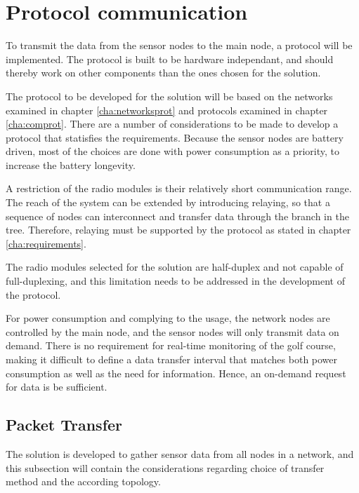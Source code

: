 \section{Protocol communication} \label{cha:protocolDesign}
To transmit the data from the sensor nodes to the main node, a protocol will be implemented. The protocol is built to be hardware independant, and should thereby work on other components than the ones chosen for the solution.

The protocol to be developed for the solution will be based on the networks examined in chapter \ref{cha:networksprot} and protocols examined in chapter \ref{cha:comprot}.
There are a number of considerations to be made to develop a protocol that statisfies the requirements.
Because the sensor nodes are battery driven, most of the choices are done with power consumption as a priority, to increase the battery longevity.

A restriction of the radio modules is their relatively short communication range. The reach of the system can be extended by introducing relaying, so that a sequence of nodes can interconnect and transfer data through the branch in the tree. Therefore, relaying must be supported by the protocol as stated in chapter \ref{cha:requirements}. 


The radio modules selected for the solution are half-duplex and not capable of full-duplexing, and this limitation needs to be addressed in the development of the protocol. 

For power consumption and complying to the usage, the network nodes are controlled by the main node, and the sensor nodes will only transmit data on demand. There is no requirement for real-time monitoring of the golf course, making it difficult to define a data transfer interval that matches both power consumption as well as the need for information.
Hence, an on-demand request for data is be sufficient.

\subsection{Packet Transfer}
The solution is developed to gather sensor data from all nodes in a network, and this subsection will contain the considerations regarding choice of transfer method and the according topology.

